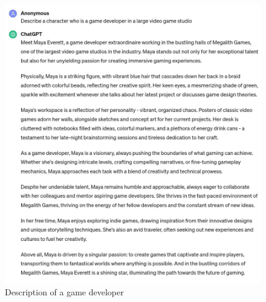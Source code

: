 \documentclass[a4paper]{article}
\begin{document}
\begin{figure}[H]
  \begin{center}
    \includegraphics[width=\textwidth]{task3/character_description_2.jpg}
    \caption{Description of a game developer}
    \label{fig:character description 2}
  \end{center}
\end{figure}
\end{document}

